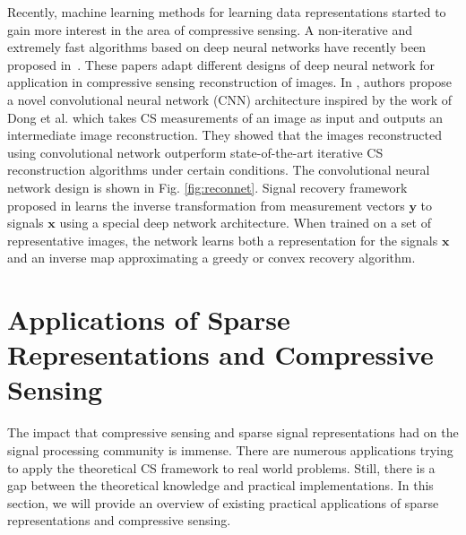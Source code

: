 \documentclass[journal]{IEEEtran}
\begin{document}
Recently, machine learning methods for learning data representations started to gain more interest in the area of compressive sensing. A non-iterative and extremely fast algorithms based on deep neural networks have recently been proposed in~\cite{Kulkarni2016, Mousavi2017, Mousavi2015}. These papers adapt different designs of deep neural network for application in compressive sensing reconstruction of images. In \cite{Kulkarni2016}, authors propose a novel convolutional neural network (CNN) architecture inspired by the work of Dong et al. \cite{Dong2016} which takes CS measurements of an image as input and outputs an intermediate image reconstruction. They showed that the images reconstructed using convolutional network outperform state-of-the-art iterative CS reconstruction algorithms under certain conditions. The convolutional neural network design is shown in Fig. \ref{fig:reconnet}. Signal recovery framework proposed in \cite{Mousavi2017} learns the inverse transformation from measurement vectors $\boldsymbol{y}$ to signals $\boldsymbol{x}$ using a special deep network architecture. When trained on a set of representative images, the network learns both a representation for the signals $\boldsymbol{x}$ and an inverse map approximating a greedy or convex recovery algorithm.

\section{Applications of Sparse Representations and Compressive Sensing} \label{sec:6}

The impact that compressive sensing and sparse signal representations had on the signal processing community is immense. There are numerous applications trying to apply the theoretical CS framework to real world problems. Still, there is a gap between the theoretical knowledge and practical implementations. In this section, we will provide an overview of existing practical applications of sparse representations and compressive sensing.
\end{document}
